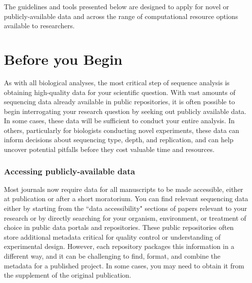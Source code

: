 \documentclass[10pt,letterpaper]{article}
\begin{document}

The guidelines and tools presented below are designed to apply for novel or publicly-available data and across the range of computational resource options available to researchers.

\section*{Before you Begin}

As with all biological analyses, the most critical step of sequence analysis is obtaining high-quality data for your scientific question. 
With vast amounts of sequencing data already available in public repositories, it is often possible to begin interrogating your research question by seeking out publicly available data. 
In some cases, these data will be sufficient to conduct your entire analysis. 
In others, particularly for biologists conducting novel experiments, these data can inform decisions about sequencing type, depth, and replication, and can help uncover potential pitfalls before they cost valuable time and resources.

\subsubsection*{Accessing publicly-available data}

Most journals now require data for all manuscripts to be made accessible, either at publication or after a short moratorium.
You can find relevant sequencing data either by starting from the ``data accessibility" sections of papers relevant to your research or by directly searching for your organism, environment, or treatment of choice in public data portals and repositories. 
These public repositories often store additional metadata critical for quality control or understanding of experimental design. However, each repository packages this information in a different way, and it can be challenging to find, format, and combine the metadata for a published project. In some cases, you may need to obtain it from the supplement of the original publication.
\end{document}
